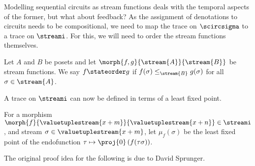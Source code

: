 Modelling sequential circuits as stream functions deals with the temporal
aspects of the former, but what about feedback?
As the assignment of denotations to circuits needs to be compositional, we need
to map the trace on \(\scircsigma\) to a trace on \(\streami\).
For this, we will need to order the stream functions themselves.

\begin{definition}\label{def:state-order}
    Let \(A\) and \(B\) be posets and let
    \(\morph{f, g}{\stream{A}}{\stream{B}}\) be stream functions.
    We say \(f \stateorder g\) if \(f(\sigma) \leq_{\stream{B}} g(\sigma)\)
    for all \(\sigma \in \stream{A}\).
\end{definition}

A trace on \(\streami\) can now be defined in terms of a least fixed
point.

\begin{notation}
    For a morphism \(
    \morph{f}{\valuetuplestream{x+m}}{\valuetuplestream{x+n}}
    \in \streami
    \), and stream \(\sigma \in \valuetuplestream{x+m}\), let
    \(\mu_f(\sigma)\) be the least fixed point of the endofunction \(
    \tau \mapsto \proj{0}\left(f(\tau\sigma)\right)
    \).
\end{notation}

The original proof idea for the following is due to David Sprunger.

